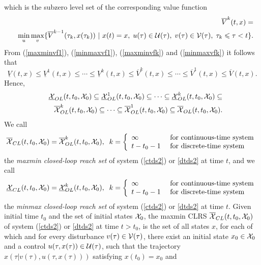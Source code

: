 which is the subzero level set of the corresponding value function
\begin{eqnarray}
&&\overline{V}^k(t, x) = \nonumber \\
&&\min_u\max_v\{\overline{V}^{k-1}(\tau_k, x(\tau_k)) ~|~ x(t)=x, \;
u(\tau)\in\UU(\tau), \; v(\tau)\in\VV(\tau), \; \tau_k\leq\tau<t\}.
\label{minmaxvfk}
\end{eqnarray}
From (\ref{maxminvf1}), (\ref{minmaxvf1}), (\ref{maxminvfk}) and
(\ref{minmaxvfk}) it follows that
\[ \underline{V}(t, x) \leq \underline{V}^1(t, x)\leq \cdots
\leq \underline{V}^k(t, x) \leq \overline{V}^k(t, x) \leq \cdots
\leq \overline{V}^1(t, x) \leq \overline{V}(t, x) .\]
Hence,
\begin{eqnarray}
&&\UXOL(t, t_0, \XX_0) \subseteq \UXOL^1(t, t_0, \XX_0) \subseteq \cdots
\subseteq \UXOL^k(t, t_0, \XX_0) \subseteq \nonumber \\
&&\OXOL^k(t, t_0, \XX_0) \subseteq \cdots \subseteq \OXOL^1(t, t_0, \XX_0)
\subseteq \OXOL(t, t_0, \XX_0) .
\label{olrsinclusion}
\end{eqnarray}
We call
\begin{equation}
\OXCL(t, t_0, \XX_0) = \OXOL^k(t, t_0, \XX_0), \;\;
k = \left\{\begin{array}{ll}
\infty & \mbox{ for continuous-time system}\\
t-t_0-1 & \mbox{ for discrete-time system}\end{array}\right.
\label{maxminclrs}
\end{equation}
the \emph{maxmin closed-loop reach set} of system (\ref{ctds2}) or \ref{dtds2}
at time $t$, and we call
\begin{equation}
\UXCL(t, t_0, \XX_0) = \UXOL^k(t, t_0, \XX_0), \;\;
k = \left\{\begin{array}{ll}
\infty & \mbox{ for continuous-time system}\\
t-t_0-1 & \mbox{ for discrete-time system}\end{array}\right.
\label{minmaxclrs}
\end{equation}
the \emph{minmax closed-loop reach set} of system (\ref{ctds2}) or \ref{dtds2}
at time $t$.
Given initial time $t_0$ and the set of initial states $\XX_0$, the maxmin
CLRS $\OXCL(t, t_0, \XX_0)$ of system (\ref{ctds2}) or \ref{dtds2} at time
$t>t_0$, is the set of all states $x$, for each of which and for every disturbance
$v(\tau)\in\VV(\tau)$, there exist an initial state $x_0\in\XX_0$ and a control
$u(\tau, x(\tau))\in\UU(\tau)$, such that the trajectory
$x(\tau | v(\tau), u(\tau, x(\tau)))$ satisfying $x(t_0) = x_0$ and
